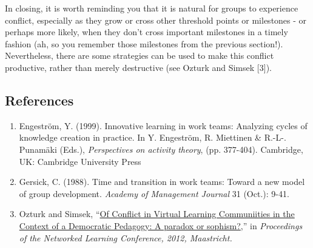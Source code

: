 
In closing, it is worth reminding you that it is natural for groups to
experience conflict, especially as they grow or cross other threshold
points or milestones - or perhaps more likely, when they don't cross
important milestones in a timely fashion (ah, so you remember those
milestones from the previous section!). Nevertheless, there are some
strategies can be used to make this conflict productive, rather than
merely destructive (see Ozturk and Simsek {[}3{]}).

\subsection{References}

\begin{enumerate}
\item
  Engeström, Y. (1999). Innovative learning in work teams: Analyzing
  cycles of knowledge creation in practice. In Y. Engeström, R.
  Miettinen \& R.-L-. Punamäki (Eds.), \emph{Perspectives on activity
  theory}, (pp. 377-404). Cambridge, UK: Cambridge University Press
\item
  Gersick, C. (1988). Time and transition in work teams: Toward a new
  model of group development. \emph{Academy of Management Journal} 31
  (Oct.): 9-41.
\item
  Ozturk and Simsek, ``\href{http://networkedlearningconference.org.uk/abstracts/pdf/ozturk.pdf}{Of Conflict in Virtual Learning Communiities in
  the Context of a Democratic Pedagogy: A paradox or sophism?},'' in
  \emph{Proceedings of the Networked Learning Conference, 2012,
  Maastricht.} 
\end{enumerate}
